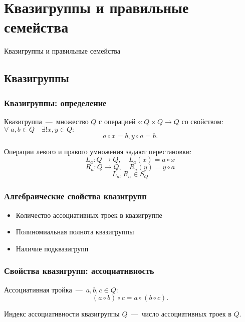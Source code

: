\section{Квазигруппы и правильные семейства}
\begin{frame}
    \begin{center}
        \Huge
        Квазигруппы и правильные семейства
    \end{center}
\end{frame}

\subsection{Квазигруппы}

\begin{frame}
    \frametitle{Квазигруппы: определение}
    \begin{dfn}
        Квазигруппа~---~множество $Q$ с операцией ${\circ \colon Q \times Q \to Q}$ со свойством: $\forall \; a, b \in Q \quad \exists ! x, y \in Q:$
        \[
            a \circ x = b, y \circ a = b.
        \]
    \end{dfn}

    \pause
    Операции левого и правого умножения задают перестановки:
    \[ 
        L_a \colon Q \to Q,\quad L_a(x) = a \circ x 
    \]
    \[
        R_a \colon Q \to Q,\quad R_a(y) = y \circ a 
    \]
    \[
        L_a, R_a \in S_Q
    \]
\end{frame}


\begin{frame}
    \frametitle{Алгебраические свойства квазигрупп}
    \begin{itemize}
        \item Количество ассоциативных троек в квазигруппе
        \item Полиномиальная полнота квазигруппы
        \item Наличие подквазигрупп
    \end{itemize}
\end{frame}


\begin{frame}
    \frametitle{Свойства квазигрупп: ассоциативность}
    \begin{dfn}
        Ассоциативная тройка~---~$a, b, c \in Q:$
        \[
            (a \circ b) \circ c = a \circ (b \circ c).
        \]

        Индекс ассоциативности квазигруппы $Q$~---~число ассоциативных троек в $Q$.
    \end{dfn}
\end{frame}



